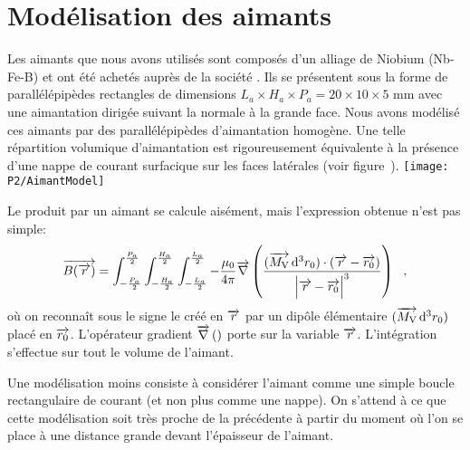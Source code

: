 \chapter{Modélisation des aimants}\label{annexe:ModelisationAimants}

Les aimants que nous avons utilisés sont composés d'un alliage de Niobium (Nb-Fe-B) et ont été achetés auprès de la société . Ils se présentent sous la forme de parallélépipèdes rectangles de dimensions $L_a \times H_a \times P_a = 20 \times 10 \times 5$ mm avec une aimantation dirigée suivant la normale à la grande face. Nous avons modélisé ces aimants par des parallélépipèdes d'aimantation homogène. Une telle répartition volumique d'aimantation est rigoureusement équivalente à la présence d'une nappe de courant surfacique sur les faces latérales (voir figure~). 
%
\bfigh
{\texttt{[image: P2/AimantModel]}}
\label{fig:AimantModel}
\efigh

Le \chm produit par un aimant se calcule aisément, mais l'expression obtenue n'est pas simple:
\begin{equation}
	\Vecteur{B(\Vecteur{r})} =
\IntegraleBornes{\IntegraleBornes{\IntegraleBornes{
	-\frac{\mu_0}{4 \pi} 
	\Gradient{
		\frac{(\Vecteur{M_{\rm V}} \ddint^3 r_0) \cdot (\Vecteur{r}-\Vecteur{r_0})} {\Module{\Vecteur{r}-\Vecteur{r_0}}^3}
	}
}{}{-\frac{L_a}{2}}{\frac{L_a}{2}}
}{}{-\frac{H_a}{2}}{\frac{H_a}{2}}
}{}{-\frac{P_a}{2}}{\frac{P_a}{2}}
	\virguleformule
	\label{eq:AimantChampExacte}
\end{equation}
où on reconnaît sous le signe  le \chm créé en $\overrightarrow{r}$ par un dipôle élémentaire $(\overrightarrow{M_{\rm V}} \, \mathrm{d}^3 r_0)$ placé en $\overrightarrow{r_0}$. L'opérateur gradient $\overrightarrow{\nabla} \left(  \right)$ porte sur la variable $\overrightarrow{r}$. L'intégration s'effectue sur tout le volume de l'aimant.

Une modélisation moins  consiste à considérer l'aimant comme une simple boucle rectangulaire de courant (et non plus comme une nappe). On s'attend à ce que cette modélisation soit très proche de la précédente à partir du moment où l'on se place à une distance grande devant l'épaisseur de l'aimant. 

